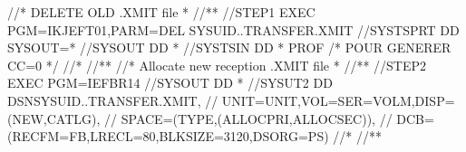 \documentclass[letterpaper,10pt,english]{sphinxmanual}
\begin{document}
\begin{sphinxVerbatim}[commandchars=\\\{\}]
//* DELETE OLD .XMIT file                                             *
//*\PYGZhy{}\PYGZhy{}\PYGZhy{}\PYGZhy{}\PYGZhy{}\PYGZhy{}\PYGZhy{}\PYGZhy{}\PYGZhy{}\PYGZhy{}\PYGZhy{}\PYGZhy{}\PYGZhy{}\PYGZhy{}\PYGZhy{}\PYGZhy{}\PYGZhy{}\PYGZhy{}\PYGZhy{}\PYGZhy{}\PYGZhy{}\PYGZhy{}\PYGZhy{}\PYGZhy{}\PYGZhy{}\PYGZhy{}\PYGZhy{}\PYGZhy{}\PYGZhy{}\PYGZhy{}\PYGZhy{}\PYGZhy{}\PYGZhy{}\PYGZhy{}\PYGZhy{}\PYGZhy{}\PYGZhy{}\PYGZhy{}\PYGZhy{}\PYGZhy{}\PYGZhy{}\PYGZhy{}\PYGZhy{}\PYGZhy{}\PYGZhy{}\PYGZhy{}\PYGZhy{}\PYGZhy{}\PYGZhy{}\PYGZhy{}\PYGZhy{}\PYGZhy{}\PYGZhy{}\PYGZhy{}\PYGZhy{}\PYGZhy{}\PYGZhy{}\PYGZhy{}\PYGZhy{}\PYGZhy{}\PYGZhy{}\PYGZhy{}\PYGZhy{}\PYGZhy{}\PYGZhy{}\PYGZhy{}\PYGZhy{}*
//STEP1 EXEC PGM=IKJEFT01,PARM=\PYGZsq{}DEL \PYGZsq{}\PYGZsq{}\PYGZam{}SYSUID..TRANSFER.XMIT\PYGZsq{}\PYGZsq{}\PYGZsq{}
//SYSTSPRT DD SYSOUT=*
//SYSOUT DD *
//SYSTSIN DD *
PROF                                            /* POUR GENERER CC=0 */
//*
//*\PYGZhy{}\PYGZhy{}\PYGZhy{}\PYGZhy{}\PYGZhy{}\PYGZhy{}\PYGZhy{}\PYGZhy{}\PYGZhy{}\PYGZhy{}\PYGZhy{}\PYGZhy{}\PYGZhy{}\PYGZhy{}\PYGZhy{}\PYGZhy{}\PYGZhy{}\PYGZhy{}\PYGZhy{}\PYGZhy{}\PYGZhy{}\PYGZhy{}\PYGZhy{}\PYGZhy{}\PYGZhy{}\PYGZhy{}\PYGZhy{}\PYGZhy{}\PYGZhy{}\PYGZhy{}\PYGZhy{}\PYGZhy{}\PYGZhy{}\PYGZhy{}\PYGZhy{}\PYGZhy{}\PYGZhy{}\PYGZhy{}\PYGZhy{}\PYGZhy{}\PYGZhy{}\PYGZhy{}\PYGZhy{}\PYGZhy{}\PYGZhy{}\PYGZhy{}\PYGZhy{}\PYGZhy{}\PYGZhy{}\PYGZhy{}\PYGZhy{}\PYGZhy{}\PYGZhy{}\PYGZhy{}\PYGZhy{}\PYGZhy{}\PYGZhy{}\PYGZhy{}\PYGZhy{}\PYGZhy{}\PYGZhy{}\PYGZhy{}\PYGZhy{}\PYGZhy{}\PYGZhy{}\PYGZhy{}\PYGZhy{}*
//* Allocate new reception .XMIT file                                 *
//*\PYGZhy{}\PYGZhy{}\PYGZhy{}\PYGZhy{}\PYGZhy{}\PYGZhy{}\PYGZhy{}\PYGZhy{}\PYGZhy{}\PYGZhy{}\PYGZhy{}\PYGZhy{}\PYGZhy{}\PYGZhy{}\PYGZhy{}\PYGZhy{}\PYGZhy{}\PYGZhy{}\PYGZhy{}\PYGZhy{}\PYGZhy{}\PYGZhy{}\PYGZhy{}\PYGZhy{}\PYGZhy{}\PYGZhy{}\PYGZhy{}\PYGZhy{}\PYGZhy{}\PYGZhy{}\PYGZhy{}\PYGZhy{}\PYGZhy{}\PYGZhy{}\PYGZhy{}\PYGZhy{}\PYGZhy{}\PYGZhy{}\PYGZhy{}\PYGZhy{}\PYGZhy{}\PYGZhy{}\PYGZhy{}\PYGZhy{}\PYGZhy{}\PYGZhy{}\PYGZhy{}\PYGZhy{}\PYGZhy{}\PYGZhy{}\PYGZhy{}\PYGZhy{}\PYGZhy{}\PYGZhy{}\PYGZhy{}\PYGZhy{}\PYGZhy{}\PYGZhy{}\PYGZhy{}\PYGZhy{}\PYGZhy{}\PYGZhy{}\PYGZhy{}\PYGZhy{}\PYGZhy{}\PYGZhy{}\PYGZhy{}*
//STEP2 EXEC PGM=IEFBR14
//SYSOUT DD *
//SYSUT2 DD DSN\PYGZam{}SYSUID..TRANSFER.XMIT,
// UNIT=\PYGZam{}UNIT,VOL=SER=\PYGZam{}VOLM,DISP=(NEW,CATLG),
// SPACE=(\PYGZam{}TYPE,(\PYGZam{}ALLOCPRI,\PYGZam{}ALLOCSEC)),
// DCB=(RECFM=FB,LRECL=80,BLKSIZE=3120,DSORG=PS)
//*
//*\PYGZhy{}\PYGZhy{}\PYGZhy{}\PYGZhy{}\PYGZhy{}\PYGZhy{}\PYGZhy{}\PYGZhy{}\PYGZhy{}\PYGZhy{}\PYGZhy{}\PYGZhy{}\PYGZhy{}\PYGZhy{}\PYGZhy{}\PYGZhy{}\PYGZhy{}\PYGZhy{}\PYGZhy{}\PYGZhy{}\PYGZhy{}\PYGZhy{}\PYGZhy{}\PYGZhy{}\PYGZhy{}\PYGZhy{}\PYGZhy{}\PYGZhy{}\PYGZhy{}\PYGZhy{}\PYGZhy{}\PYGZhy{}\PYGZhy{}\PYGZhy{}\PYGZhy{}\PYGZhy{}\PYGZhy{}\PYGZhy{}\PYGZhy{}\PYGZhy{}\PYGZhy{}\PYGZhy{}\PYGZhy{}\PYGZhy{}\PYGZhy{}\PYGZhy{}\PYGZhy{}\PYGZhy{}\PYGZhy{}\PYGZhy{}\PYGZhy{}\PYGZhy{}\PYGZhy{}\PYGZhy{}\PYGZhy{}\PYGZhy{}\PYGZhy{}\PYGZhy{}\PYGZhy{}\PYGZhy{}\PYGZhy{}\PYGZhy{}\PYGZhy{}\PYGZhy{}\PYGZhy{}\PYGZhy{}\PYGZhy{}*

\end{sphinxVerbatim}
\end{document}

